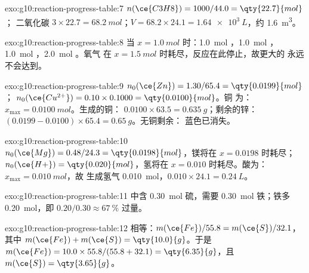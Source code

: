 \begin{solution}{exo:g10:reaction-progress-table:7}
$n(\ce{C3H8}) = 1000 / 44.0 = \qty{22.7}{mol}$；
二氧化碳 $3 \times 22.7 = \qty{68.2}{mol}$；$V = 68.2 \times 24.1 =
\qty{1.64e3}{L}$，约 \qty{1.6}{m^3}。
\end{solution}

\begin{solution}{exo:g10:reaction-progress-table:8}
当 $x = \qty{1.0}{mol}$ 时：\qty{1.0}{mol} ，\qty{1.0}{mol}
，\qty{1.0}{mol} ，\qty{2.0}{mol} 。氧气
在 $x = \qty{1.5}{mol}$ 时耗尽，反应在此停止，故更大的
永远不会达到。
\end{solution}

\begin{solution}{exo:g10:reaction-progress-table:9}
$n_0(\ce{Zn}) = 1.30 / 65.4 = \qty{0.0199}{mol}$；
$n_0(\ce{Cu^{2+}}) = 0.10 \times 0.1000 = \qty{0.0100}{mol}$。铜
为：$x_{\max} = \qty{0.0100}{mol}$。生成的铜：
$0.0100 \times 63.5 = \qty{0.635}{g}$；剩余的锌：
$(0.0199 - 0.0100) \times 65.4 = \qty{0.65}{g}$。无铜剩余：
蓝色已消失。
\end{solution}

\begin{solution}{exo:g10:reaction-progress-table:10}
$n_0(\ce{Mg}) = 0.48 / 24.3 = \qty{0.0198}{mol}$，镁将在
$x = 0.0198$ 时耗尽；$n_0(\ce{H+}) = \qty{0.020}{mol}$，氢将在
$x = 0.010$ 时耗尽。酸为：$x_{\max} = \qty{0.010}{mol}$，故
生成氢气 \qty{0.010}{mol}，$0.010 \times 24.1 = \qty{0.24}{L}$。
\end{solution}

\begin{solution}{exo:g10:reaction-progress-table:11}
中含 \qty{0.30}{mol} 硫，需要
\qty{0.30}{mol} 铁；铁多 \qty{0.20}{mol}，即
$0.20 / 0.30 \approx \qty{67}{\percent}$ 过量。
\end{solution}

\begin{solution}{exo:g10:reaction-progress-table:12}
相等：$m(\ce{Fe})/55.8 = m(\ce{S})/32.1$，其中
$m(\ce{Fe}) + m(\ce{S}) = \qty{10.0}{g}$。于是
$m(\ce{Fe}) = 10.0 \times 55.8 / (55.8 + 32.1) = \qty{6.35}{g}$，且
$m(\ce{S}) = \qty{3.65}{g}$。
\end{solution}

